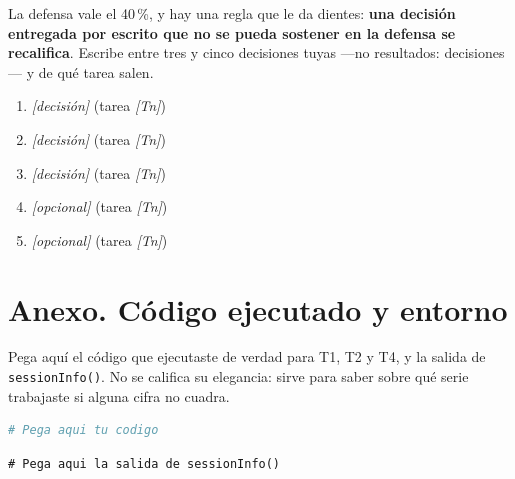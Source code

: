 \documentclass[11pt,a4paper,oneside]{article}
\newcommand{\marcador}[1]{\textcolor{grismarcador}{\textit{[#1]}}}
\begin{document}
La defensa vale el 40\,\%, y hay una regla que le da dientes: \textbf{una decisión entregada por
escrito que no se pueda sostener en la defensa se recalifica}. Escribe entre tres y cinco
decisiones tuyas —no resultados: decisiones— y de qué tarea salen.

\begin{enumerate}[leftmargin=*,itemsep=4pt]
  \item \marcador{decisión} \hfill \textcolor{grismarcador}{\small (tarea \marcador{Tn})}
  \item \marcador{decisión} \hfill \textcolor{grismarcador}{\small (tarea \marcador{Tn})}
  \item \marcador{decisión} \hfill \textcolor{grismarcador}{\small (tarea \marcador{Tn})}
  \item \marcador{opcional} \hfill \textcolor{grismarcador}{\small (tarea \marcador{Tn})}
  \item \marcador{opcional} \hfill \textcolor{grismarcador}{\small (tarea \marcador{Tn})}
\end{enumerate}

\newpage
\section*{Anexo. Código ejecutado y entorno}

Pega aquí el código que ejecutaste de verdad para T1, T2 y T4, y la salida de
\texttt{sessionInfo()}. No se califica su elegancia: sirve para saber sobre qué serie trabajaste si
alguna cifra no cuadra.

\begin{lstlisting}[language=R]
# Pega aqui tu codigo
\end{lstlisting}

\begin{lstlisting}
# Pega aqui la salida de sessionInfo()
\end{lstlisting}
\end{document}
